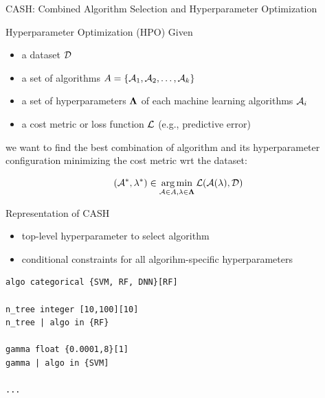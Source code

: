 \begin{frame}[c]{CASH: Combined Algorithm Selection and Hyperparameter Optimization}

\begin{block}{Hyperparameter Optimization (HPO)}
Given
\begin{itemize}
  \item a dataset $\mathcal{D}$
  \item a set of algorithms $A = \{\mathcal{A}_1, \mathcal{A}_2, \ldots, \mathcal{A}_k\}$
  \item a set of hyperparameters $\mathbf{\Lambda}$ of each machine learning algorithms $\mathcal{A}_i$
  \item a cost metric or loss function $\mathcal{L}$ (e.g., predictive error)
\end{itemize}
we want to find the best combination of algorithm and its hyperparameter configuration minimizing the cost metric wrt the dataset:

\begin{equation}
(\mathcal{A}^*, \mathbf{\lambda}^*) \in \operatorname*{arg\,min}_{\mathcal{A} \in A, \mathbf{\lambda} \in \mathbf{\Lambda}} \mathcal{L}(\mathcal{A}(\mathbf{\lambda}), \mathcal{D}) \nonumber
\end{equation}

\end{block}

\end{frame}
\begin{frame}[c, fragile]{Representation of CASH}

\begin{itemize}
  \item top-level hyperparameter to select algorithm
  \item conditional constraints for all algorihm-specific hyperparameters
\end{itemize}

\pause

\begin{verbatim}
algo categorical {SVM, RF, DNN}[RF]

n_tree integer [10,100][10]
n_tree | algo in {RF}

gamma float {0.0001,8}[1]
gamma | algo in {SVM]

...
\end{verbatim}

\end{frame}
